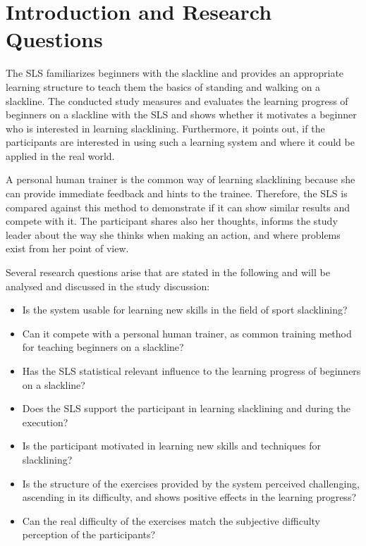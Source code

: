 \section{Introduction and Research Questions}\label{6_introduction}
The SLS familiarizes beginners with the slackline and provides an appropriate learning structure to teach them the basics of standing and walking on a slackline.
The conducted study measures and evaluates the learning progress of beginners on a slackline with the SLS and shows whether it motivates a beginner who is interested in learning slacklining.
Furthermore, it points out, if the participants are interested in using such a learning system and where it could be applied in the real world.

A personal human trainer is the common way of learning slacklining because she can provide immediate feedback and hints to the trainee.
Therefore, the SLS is compared against this method to demonstrate if it can show similar results and compete with it.
The participant shares also her thoughts, informs the study leader about the way she thinks when making an action, and where problems exist from her point of view.

Several research questions arise that are stated in the following and will be analysed and discussed in the study discussion:

\begin{itemize}
\item Is the system usable for learning new skills in the field of sport slacklining?
\item Can it compete with a personal human trainer, as common training method for teaching beginners on a slackline?
\item Has the SLS statistical relevant influence to the learning progress of beginners on a slackline?
\item Does the SLS support the participant in learning slacklining and during the execution?
\item Is the participant motivated in learning new skills and techniques for slacklining?
\item Is the structure of the exercises provided by the system perceived challenging, ascending in its difficulty, and shows positive effects in the learning progress?
\item Can the real difficulty of the exercises match the subjective difficulty perception of the participants?
\end{itemize}
